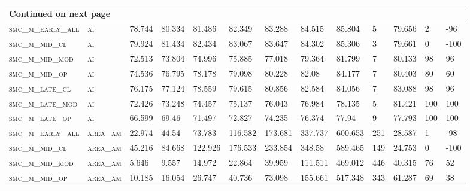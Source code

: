 \begin{landscape}
\begin{center}
\begin{footnotesize}
\begin{longtable}{lllllllllllll}
\hline \multicolumn{13}{|l|}{{Continued on next page}} \\ \hline
\endfoot

\hline \hline
\endlastfoot

\textsc{smc\_m\_early\_all} & \textsc{ai        }   & 78.744   & 80.334   & 81.486   & 82.349   & 83.288   & 84.515   & 85.804   & 5      & 79.656        & 2             & -96      \\
\textsc{smc\_m\_mid\_cl   } & \textsc{ai        }   & 79.924   & 81.434   & 82.434   & 83.067   & 83.647   & 84.302   & 85.306   & 3      & 79.661        & 0             & -100     \\
\textsc{smc\_m\_mid\_mod  } & \textsc{ai        }   & 72.513   & 73.804   & 74.996   & 75.885   & 77.018   & 79.364   & 81.799   & 7      & 80.133        & 98            & 96       \\
\textsc{smc\_m\_mid\_op   } & \textsc{ai        }   & 74.536   & 76.795   & 78.178   & 79.098   & 80.228   & 82.08    & 84.177   & 7      & 80.403        & 80            & 60       \\
\textsc{smc\_m\_late\_cl  } & \textsc{ai        }   & 76.175   & 77.124   & 78.559   & 79.615   & 80.856   & 82.584   & 84.056   & 7      & 83.088        & 98            & 96       \\
\textsc{smc\_m\_late\_mod } & \textsc{ai        }   & 72.426   & 73.248   & 74.457   & 75.137   & 76.043   & 76.984   & 78.135   & 5      & 81.421        & 100           & 100      \\
\textsc{smc\_m\_late\_op  } & \textsc{ai        }   & 66.599   & 69.46    & 71.497   & 72.827   & 74.235   & 76.374   & 77.94    & 9      & 77.793        & 100           & 100      \\
\textsc{smc\_m\_early\_all} & \textsc{area\_am  }   & 22.974   & 44.54    & 73.783   & 116.582  & 173.681  & 337.737  & 600.653  & 251    & 28.587        & 1             & -98      \\
\textsc{smc\_m\_mid\_cl   } & \textsc{area\_am  }   & 45.216   & 84.668   & 122.926  & 176.533  & 233.854  & 348.58   & 589.465  & 149    & 24.753        & 0             & -100     \\
\textsc{smc\_m\_mid\_mod  } & \textsc{area\_am  }   & 5.646    & 9.557    & 14.972   & 22.864   & 39.959   & 111.511  & 469.012  & 446    & 40.315        & 76            & 52       \\
\textsc{smc\_m\_mid\_op   } & \textsc{area\_am  }   & 10.185   & 16.054   & 26.747   & 40.736   & 73.098   & 155.661  & 517.348  & 343    & 61.287        & 69            & 38       \\

\end{longtable}
\end{footnotesize}
\end{center}
\end{landscape}
